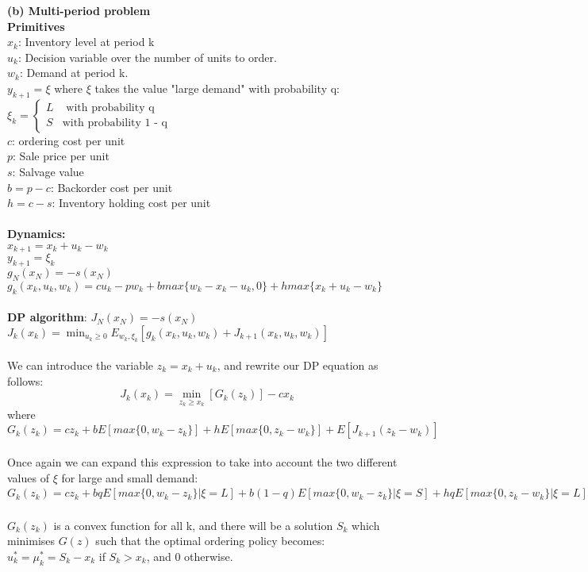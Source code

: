 \documentclass[11pt, english]{article}
\begin{document}
\textbf{(b) Multi-period problem}\\
\textbf{Primitives}\\
$x_k$: Inventory level at period k \\$u_k$: Decision variable over the number of units to order.\\ $w_k$: Demand at period k.\\ $y_{k+1} = \xi$ where $\xi$ takes the value "large demand" with probability q:\\ $\xi_k =     \left\{ \begin{array}{rcl}
         L & \mbox{ with probability q}\\ 
         S  & \mbox{with probability 1 - q}
                \end{array}\right.$\\
$c$: ordering cost per unit\\ $p$: Sale price per unit\\ $s$: Salvage value\\ $b = p - c$: Backorder cost per unit\\ $h = c - s$: Inventory holding cost per unit\\
\\
\textbf{Dynamics:}\\
$x_{k+1} = x_k + u_k - w_k$\\ $y_{k+1} = \xi_k$\\ $g_N(x_N) = -s(x_N)$\\ $g_k(x_k, u_k, w_k) = cu_k - pw_k + b max\{w_k - x_k - u_k, 0\} + h max\{x_k + u_k - w_k\}$\\
\\
\textbf{DP algorithm}:
$J_N(x_N) = -s(x_N)$\\
$J_k(x_k) = \min_{u_k \geq 0}E_{w_k, \xi_k}[g_k(x_k, u_k, w_k) + J_{k+1}(x_k, u_k, w_k)]$\\
\\
We can introduce the variable $z_k = x_k + u_k$, and rewrite our DP equation as follows:\\
$$J_k(x_k) = \min_{z_k \geq x_k}[G_k(z_k)] - cx_k$$
where $G_k(z_k) = cz_k + bE[max\{0, w_k - z_k\}] + hE[max\{0, z_k - w_k\}] + E[J_{k+1}(z_k - w_k)]$\\
\\
Once again we can expand this expression to take into account the two different values of $\xi$ for large and small demand:\\
$G_k(z_k) = cz_k + bqE[max\{0, w_k - z_k\} | \xi = L] + b(1 -q)E[max\{0, w_k - z_k\} | \xi = S] + hqE[max\{0, z_k - w_k\} | \xi = L] + h(1 -q)E[max\{0, z_k - w_k\} | \xi = S] + E[J_{k+1}(z_k - w_k)]$\\
\\
$G_k(z_k)$ is a convex function for all k, and there will be a solution $S_k$ which minimises $G(z)$ such that the optimal ordering policy becomes:\\
$u_k^* = \mu_k^* = S_k - x_k$ if $S_k > x_k$, and 0 otherwise.
\end{document}
